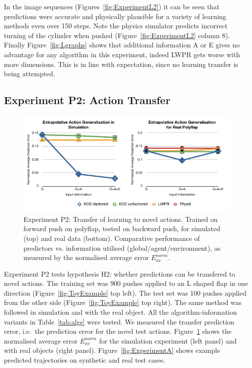 In the image sequences (Figures~\ref{fig:ExperimentL2}) it can be
seen that predictions were accurate and physically plausible for a
variety of learning methods even over 150 steps. Note the physics
simulator predicts incorrect turning of the cylinder when pushed
(Figure~\ref{fig:ExperimentL2} column 8). Finally Figure~\ref{fig:Lgraphs} shows that additional information A or E gives no advantage for any algorithm in this experiment, indeed LWPR gets worse with more dimensions. This is in line with expectation, since no learning transfer is being attempted.

\subsection{Experiment P2: Action Transfer}
\label{sec:Results.Action}

\begin{figure}[t]
\centerline{\includegraphics[width=\columnwidth]{graphs_jw/P2-graphs}}
\caption{Experiment P2: Transfer of learning to novel actions.
Trained on forward push on polyflap, tested on backward push,
for simulated (top) and real data (bottom).
Comparative performance of predictors vs. information utilised
(global/agent/environment),
as measured by the normalised average error ${E_{av}^{norm}}$.
}\label{fig:A_av_graphs}
\end{figure}

Experiment P2 tests hypothesis H2: whether predictions can be
transfered to novel actions.  The training set was 900 pushes applied to an L shaped flap in one direction (Figure~\ref{fig:ToyExample} top
left).  The test set was 100 pushes applied from the other side (Figure~\ref{fig:ToyExample} top right). The same method was followed in simulation and with the real object. All the algorithm-information variants in Table~\ref{tab:algs} were tested. We measured the transfer prediction error, i.e.\ the prediction error for the novel test actions. Figure~\ref{fig:A_av_graphs} %
shows the normalised average error $E_{av}^{norm}$ for the simulation experiment (left panel) and with real objects (right panel).
Figure~\ref{fig:ExperimentA} shows example predicted trajectories on
synthetic and real test cases.


